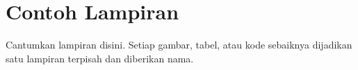 \chapter{Contoh Lampiran}

Cantumkan lampiran disini. Setiap gambar, tabel, atau kode sebaiknya dijadikan satu lampiran terpisah dan diberikan nama. 